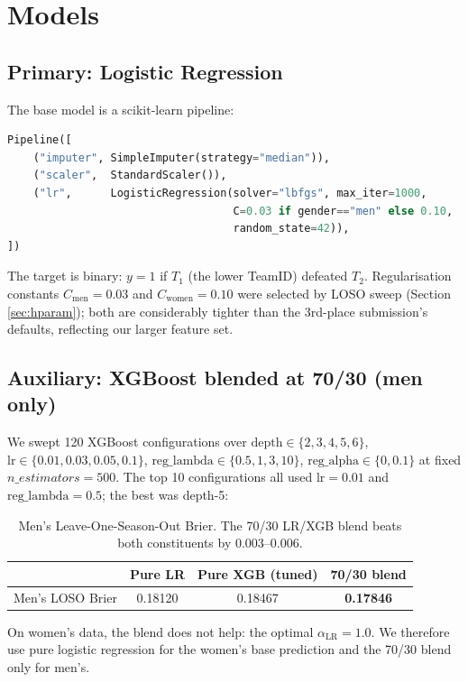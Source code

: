 \documentclass[11pt, a4paper]{article}
\begin{document}
\section{Models}
\label{sec:models}

\subsection{Primary: Logistic Regression}
\label{sec:lr}

The base model is a scikit-learn pipeline:
\begin{lstlisting}[language=Python]
Pipeline([
    ("imputer", SimpleImputer(strategy="median")),
    ("scaler",  StandardScaler()),
    ("lr",      LogisticRegression(solver="lbfgs", max_iter=1000,
                                   C=0.03 if gender=="men" else 0.10,
                                   random_state=42)),
])
\end{lstlisting}
The target is binary: $y = 1$ if $T_1$ (the lower TeamID) defeated $T_2$. Regularisation constants $C_{\text{men}} = 0.03$ and $C_{\text{women}} = 0.10$ were selected by LOSO sweep (Section \ref{sec:hparam}); both are considerably tighter than the 3rd-place submission's defaults, reflecting our larger feature set.

\subsection{Auxiliary: XGBoost blended at 70/30 (men only)}
\label{sec:xgb}

We swept 120 XGBoost configurations over $\text{depth} \in \{2,3,4,5,6\}$, $\text{lr} \in \{0.01, 0.03, 0.05, 0.1\}$, $\text{reg\_lambda} \in \{0.5, 1, 3, 10\}$, $\text{reg\_alpha} \in \{0, 0.1\}$ at fixed $n\_estimators = 500$. The top 10 configurations all used $\text{lr} = 0.01$ and $\text{reg\_lambda} = 0.5$; the best was depth-5:
\begin{table}[H]
\centering
\begin{tabular}{@{}lccc@{}}
\toprule
 & \textbf{Pure LR} & \textbf{Pure XGB (tuned)} & \textbf{70/30 blend} \\
\midrule
Men's LOSO Brier & 0.18120 & 0.18467 & \textbf{0.17846} \\
\bottomrule
\end{tabular}
\caption{Men's Leave-One-Season-Out Brier. The 70/30 LR/XGB blend beats both constituents by 0.003--0.006.}
\end{table}
On women's data, the blend does not help: the optimal $\alpha_{\text{LR}} = 1.0$. We therefore use pure logistic regression for the women's base prediction and the 70/30 blend only for men's.
\end{document}
